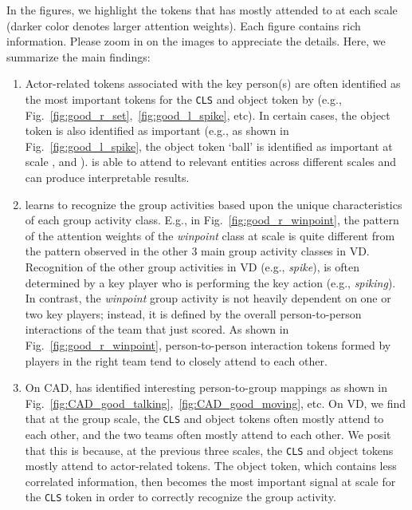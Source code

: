 \documentclass[runningheads]{llncs}
\begin{document}
In the figures, we highlight the tokens that \ours has mostly attended to at each scale (darker color denotes larger attention weights). Each figure contains rich information. Please zoom in on the images to appreciate the details.
Here, we summarize the main findings:
\begin{enumerate}
    \item Actor-related tokens associated with the key person(s) are often identified as the most important tokens for the \texttt{CLS} and object token by \ours (e.g., Fig.~\ref{fig:good_r_set},~\ref{fig:good_l_spike}, etc). In certain cases, the object token is also identified as important (e.g., as shown in Fig.~\ref{fig:good_l_spike}, the object token `ball' is identified as important at scale ,  and ). \ours is able to attend to relevant entities across different scales and can produce interpretable results.
    
    \item \ours learns to recognize the group activities based upon the unique characteristics of each group activity class. E.g., in Fig.~\ref{fig:good_r_winpoint}, the pattern of the attention weights  of the \textit{winpoint} class at scale   
    is quite different from the pattern observed in the other 3 main group activity classes in VD.
    Recognition of the other group activities in VD (e.g., \textit{spike}), is often determined by a key player who is performing the key action (e.g., \textit{spiking}). In contrast,  the \textit{winpoint} group activity
    is not heavily dependent on one or two key players; instead, it
    is defined by the overall person-to-person interactions of the team that just scored. As shown in Fig.~\ref{fig:good_r_winpoint}, person-to-person interaction tokens formed by players in the right team tend to closely attend to each other.
     
    \item On CAD, \ours has identified interesting person-to-group mappings as shown in Fig.~\ref{fig:CAD_good_talking},~\ref{fig:CAD_good_moving}, etc. On VD, we find that at the group scale, the \texttt{CLS} and object tokens often mostly attend to each other, and the two teams often mostly attend to each other. We posit that this is because, at the previous three scales, the \texttt{CLS} and object tokens mostly attend to actor-related tokens. The object token, which contains less correlated information, then becomes  the most important signal at scale  for the \texttt{CLS} token in order to correctly recognize the group activity.
    
\end{enumerate}
\end{document}
